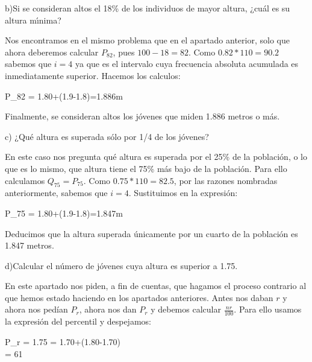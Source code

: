 b)Si se consideran altos el 18\% de los individuos de mayor altura, ¿cuál es su altura mı́nima?

Nos encontramos en el mismo problema que en el apartado anterior, solo que ahora deberemos calcular $P_{82}$, pues $100-18=82$. Como $0.82*110=90.2$ sabemos que $i=4$ ya que es el intervalo cuya frecuencia absoluta acumulada es inmediatamente superior. Hacemos los calculos:
\\
\begin{center}
    \begin{*gather}
        P_{82} = 1.80+(1.9-1.8)=1.886m
    \end{*gather}
\end{center}

Finalmente, se consideran altos los jóvenes que miden 1.886 metros o más.

c) ¿Qué altura es superada sólo por 1/4 de los jóvenes?

En este caso nos pregunta qué altura es superada por el 25\% de la población, o lo que es lo mismo, que altura tiene el 75\% más bajo de la población. Para ello calculamos $Q_{75} = P_{75}$. Como $0.75*110=82.5$, por las razones nombradas anteriormente, sabemos que $i = 4$. Sustituimos en la expresión:
\\
\begin{center}
    \begin{*gather}
        P_{75} = 1.80+(1.9-1.8)=1.847m
    \end{*gather}
\end{center}

Deducimos que la altura superada únicamente por un cuarto de la población es 1.847 metros.

d)Calcular el número de jóvenes cuya altura es superior a 1.75.

En este apartado nos piden, a fin de cuentas, que hagamos el proceso contrario al que hemos estado haciendo en los apartados anteriores. Antes nos daban $r$ y ahora nos pedían $P_{r}$, ahora nos dan $P_{r}$ y debemos calcular $\frac{nr}{100}$. Para ello usamos la expresión del percentil y despejamos:
\\
\begin{center}
    \begin{*gather}
        P_{r} = 1.75 = 1.70+(1.80-1.70)\\
         = 61\\
    \end{*gather}
\end{center}


